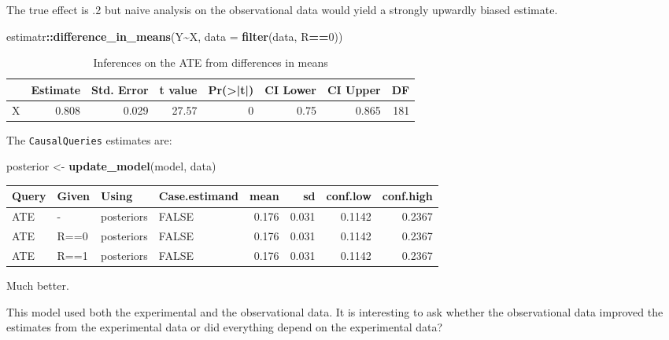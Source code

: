 \documentclass[
  12pt,
]{book}
\newenvironment{Shaded}{\begin{snugshade}}{\end{snugshade}}
\newcommand{\AttributeTok}[1]{\textcolor[rgb]{0.13,0.29,0.53}{#1}}
\newcommand{\DecValTok}[1]{\textcolor[rgb]{0.00,0.00,0.81}{#1}}
\newcommand{\FunctionTok}[1]{\textcolor[rgb]{0.13,0.29,0.53}{\textbf{#1}}}
\newcommand{\NormalTok}[1]{#1}
\newcommand{\OtherTok}[1]{\textcolor[rgb]{0.56,0.35,0.01}{#1}}
\newcommand{\SpecialCharTok}[1]{\textcolor[rgb]{0.81,0.36,0.00}{\textbf{#1}}}
\begin{document}
The true effect is .2 but naive analysis on the observational data would yield a strongly upwardly biased estimate.

\begin{Shaded}
\begin{Highlighting}[]
\NormalTok{estimatr}\SpecialCharTok{::}\FunctionTok{difference\_in\_means}\NormalTok{(Y}\SpecialCharTok{\textasciitilde{}}\NormalTok{X, }\AttributeTok{data =} \FunctionTok{filter}\NormalTok{(data, R}\SpecialCharTok{==}\DecValTok{0}\NormalTok{))}
\end{Highlighting}
\end{Shaded}

\begin{table}

\caption{\label{tab:unnamed-chunk-118}Inferences on the ATE from differences in means}
\centering
\begin{tabular}[t]{l|r|r|r|r|r|r|r}
\hline
  & Estimate & Std. Error & t value & Pr(>|t|) & CI Lower & CI Upper & DF\\
\hline
X & 0.808 & 0.029 & 27.57 & 0 & 0.75 & 0.865 & 181\\
\hline
\end{tabular}
\end{table}

The \texttt{CausalQueries} estimates are:

\begin{Shaded}
\begin{Highlighting}[]
\NormalTok{posterior }\OtherTok{\textless{}{-}} \FunctionTok{update\_model}\NormalTok{(model, data)}
\end{Highlighting}
\end{Shaded}

\begin{tabular}{l|l|l|l|r|r|r|r}
\hline
Query & Given & Using & Case.estimand & mean & sd & conf.low & conf.high\\
\hline
ATE & - & posteriors & FALSE & 0.176 & 0.031 & 0.1142 & 0.2367\\
\hline
ATE & R==0 & posteriors & FALSE & 0.176 & 0.031 & 0.1142 & 0.2367\\
\hline
ATE & R==1 & posteriors & FALSE & 0.176 & 0.031 & 0.1142 & 0.2367\\
\hline
\end{tabular}

Much better.

This model used both the experimental and the observational data. It is interesting to ask whether the observational data improved the estimates from the experimental data or did everything depend on the experimental data?
\end{document}

